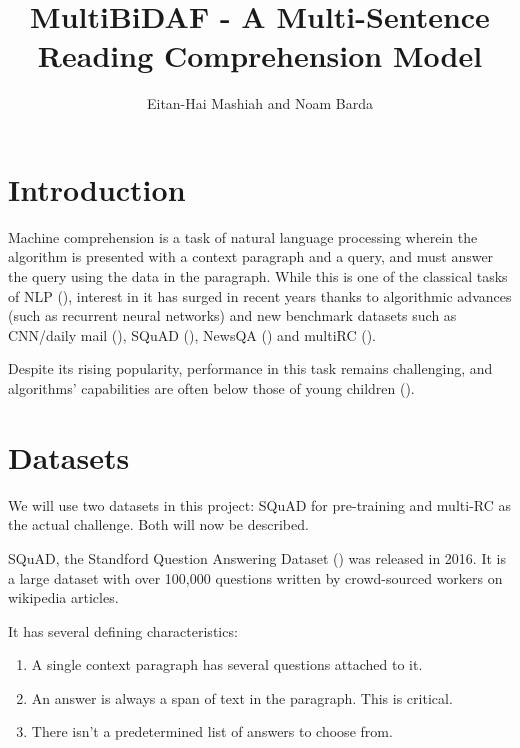 \documentclass[12pt, a4paper]{article}
\begin{document}
	
	\title{MultiBiDAF - A Multi-Sentence Reading Comprehension Model}
	\author{Eitan-Hai Mashiah and Noam Barda}
	\maketitle
	
	\begin{multicols}{2}
		
		\section{Introduction}
		
			Machine comprehension is a task of natural language processing wherein the algorithm is presented with a context paragraph and a query, and must answer the query using the data in the paragraph. While this is one of the classical tasks of NLP (\cite{Mccarthy1976}), interest in it has surged in recent years thanks to algorithmic advances (such as recurrent neural networks) and new benchmark datasets such as CNN/daily mail (\cite{Hermann2015}), SQuAD (\cite{Rajpurkar2016}), NewsQA (\cite{Trischler2016}) and multiRC (\cite{N18-1023}).
			
			Despite its rising popularity, performance in this task remains challenging, and algorithms' capabilities are often below those of young children (\cite{Clark2016}).
			
		\section{Datasets}
		
			We will use two datasets in this project: SQuAD for pre-training and multi-RC as the actual challenge. Both will now be described.
			
			SQuAD, the Standford Question Answering Dataset (\cite{Rajpurkar2016}) was released in 2016. It is a large dataset with over 100,000 questions written by crowd-sourced workers on wikipedia articles.
			
			It has several defining characteristics:
			\begin{enumerate}
				\item A single context paragraph has several questions attached to it.
				\item An answer is always a span of text in the paragraph. This is critical.
				\item There isn't a predetermined list of answers to choose from.
			\end{enumerate}
		

\end{multicols}
\end{document}
